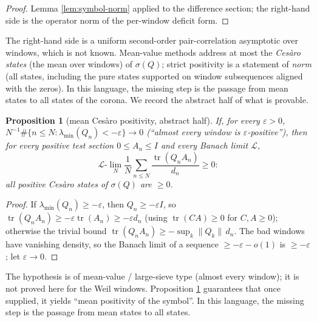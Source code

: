 \documentclass[11pt,reqno]{amsart}
\newtheorem{proposition}[theorem]{Proposition}
\theoremstyle{definition}
\newcommand{\tr}{\operatorname{tr}}
\begin{document}
\begin{proof}
Lemma \ref{lem:symbol-norm} applied to the difference section; the right-hand
side is the operator norm of the per-window deficit form.
\end{proof}

The right-hand side is a uniform second-order pair-correlation asymptotic
over windows, which is not known. Mean-value methods address at most the
\emph{Ces\`aro states} (the mean over windows) of \(\sigma(Q)\); strict
positivity is a statement of \emph{norm} (all states, including the pure states
supported on window subsequences aligned with the zeros). In this language,
the missing step is the passage from mean states to all states of the corona.
We record the abstract half of what is
provable.

\begin{proposition}[mean Ces\`aro positivity, abstract half]\label{prop:cesaro}
If, for every \(\varepsilon>0\),
\(N^{-1}\#\{n\leq N:\lambda_{\min}(Q_n)<-\varepsilon\}\to0\) (``almost every
window is \(\varepsilon\)-positive''), then for every positive test section
\(0\leq A_n\leq I\) and every Banach limit \(\mathcal L\),
\[
\mathcal L\text{-}\lim_N\frac1N\sum_{n\leq N}\frac{\tr(Q_nA_n)}{d_n}\geq0:
\]
all positive Ces\`aro states of \(\sigma(Q)\) are \(\geq0\).
\end{proposition}

\begin{proof}
If \(\lambda_{\min}(Q_n)\geq-\varepsilon\), then \(Q_n\geq-\varepsilon I\), so
\(\tr(Q_nA_n)\geq-\varepsilon\tr(A_n)\geq-\varepsilon d_n\) (using
\(\tr(CA)\geq0\) for \(C,A\geq0\)); otherwise the trivial bound
\(\tr(Q_nA_n)\geq-\sup_k\|Q_k\|\,d_n\). The bad windows have vanishing density,
so the Banach limit of a sequence \(\geq-\varepsilon-o(1)\) is
\(\geq-\varepsilon\); let \(\varepsilon\to0\).
\end{proof}

The hypothesis is of mean-value / large-sieve type (almost every window); it
is not proved here for the Weil windows. Proposition \ref{prop:cesaro}
guarantees that once supplied, it yields ``mean positivity of the symbol''.
In this language, the missing step is the passage from mean states to all
states.
\end{document}
